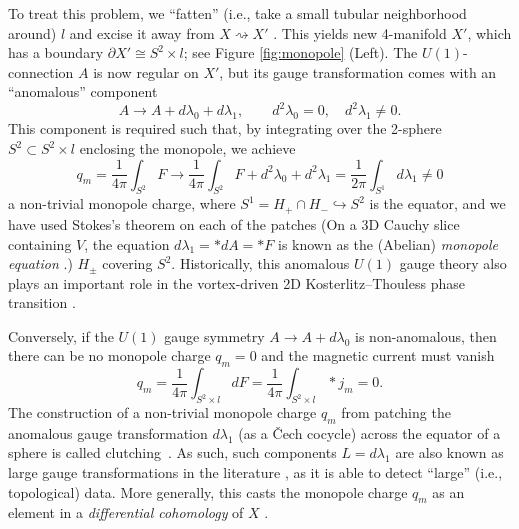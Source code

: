 \documentclass[onecolumn]{article}
\theoremstyle{theorem}
\theoremstyle{remark}
\theoremstyle{example}
\theoremstyle{definition}
\numberwithin{equation}{section}
\begin{document}
To treat this problem, we ``fatten'' (i.e., take a small tubular neighborhood around) $l$ and excise it away from $X \rightsquigarrow X'$ \cite{book-wen}. This yields new 4-manifold $X'$, which has a boundary $\partial X' \cong S^2\times l$; see Figure \ref{fig:monopole} {(Left).} %
 The $U(1)$-connection $A$ is now regular on $X'$, but its gauge transformation comes with an ``anomalous'' component \cite{Halperin:1978,Kogan:1995}
\begin{equation}
    A\rightarrow A + d\lambda_0 + d\lambda_1,\qquad d^2\lambda_0=0,\quad d^2\lambda_1\neq 0.\nonumber 
\end{equation}
{This} component is required such that, by integrating over the 2-sphere $S^2\subset S^2\times l$ enclosing the monopole, we achieve
\begin{equation}
    {q}_m = \frac{1}{4\pi}\int_{S^2}F \rightarrow \frac{1}{4\pi}\int_{S^2}F+d^2\lambda_0 + d^2\lambda_1 = \frac{1}{2\pi}\int_{S^1}d\lambda_1 \neq 0 \nonumber
\end{equation}
a non-trivial monopole charge, where $S^1 = H_+\cap H_-\hookrightarrow S^2$ is the equator, and we have used Stokes's theorem on each of the patches {(On a 3D Cauchy slice containing $V$, the equation $d\lambda_1 = \ast dA=\ast F$ is known as the (Abelian)} {\it {monopole equation}} \cite{Dai2005OnTS}.) $H_\pm$ covering $S^2$. Historically, this anomalous $U(1)$ gauge theory also plays an important role in the vortex-driven 2D Kosterlitz--Thouless phase transition \cite{Halperin:1978}.

Conversely, if the $U(1)$ gauge symmetry $A\rightarrow A+ d\lambda_0$ is non-anomalous, then there can be no monopole charge ${q}_m=0$ and the magnetic current must vanish
\begin{equation}
    {q}_m = \frac{1}{4\pi}\int_{S^2\times l}dF = \frac{1}{4\pi}\int_{S^2\times l}\ast j_m =  0.\nonumber
\end{equation}
{The} construction of a non-trivial monopole charge $q_m$ from patching the anomalous gauge transformation $d\lambda_1$ (as a {\v C}ech cocycle) across the equator of a sphere is called { {clutching}}~\cite{book-algtop}. As such, such components $L = d\lambda_1$ are also known as { {large gauge transformations}} in the literature \cite{Kogan:1995,adler2004anomalies}, as it is able to detect ``large'' (i.e., topological) data. More generally, this casts the monopole charge $q_m$ as an element in a {\it {differential cohomology}} of $X$ \cite{FreedMonopole}. 
\end{document}
